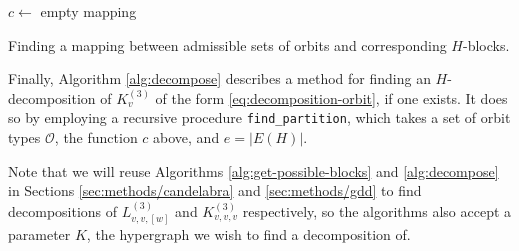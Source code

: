 \begin{algorithm}

$c \gets$ empty mapping\;
\;

\caption{Finding a mapping between admissible sets of orbits and corresponding $H$-blocks.} \label{alg:get-possible-blocks}
\end{algorithm}

Finally, Algorithm \ref{alg:decompose} describes a method for finding an $H$-decomposition of $K_{v}^{(3)}$ of the form \eqref{eq:decomposition-orbit}, if one exists. It does so by employing a recursive procedure {\tt find\_partition}, which takes a set of orbit types $\mathcal{O}$, the function $c$ above, and $e = |E(H)|$.

Note that we will reuse Algorithms \ref{alg:get-possible-blocks} and \ref{alg:decompose} in Sections \ref{sec:methods/candelabra} and \ref{sec:methods/gdd} to find decompositions of $L_{v,v,[w]}^{(3)}$ and $K_{v,v,v}^{(3)}$ respectively, so the algorithms also accept a parameter $K$, the hypergraph we wish to find a decomposition of.

